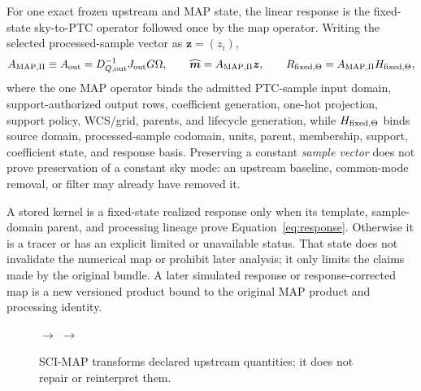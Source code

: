 \documentclass[10pt]{article}
\begin{document}
For one exact frozen upstream and MAP state, the linear response is the
fixed-state sky-to-PTC operator followed once by the map operator. Writing the
selected processed-sample vector as \(\boldsymbol z=(z_i)\),
\begin{equation}
 A_{{\rm MAP},\Pi}\equiv A_{\rm out}
 =D_{Q,{\rm out}}^{-1}J_{\rm out}G\Omega,\qquad
 \widehat{\boldsymbol m}=A_{{\rm MAP},\Pi}\boldsymbol z,\qquad
 R_{{\rm fixed},\Theta}=A_{{\rm MAP},\Pi}H_{{\rm fixed},\Theta},
 \label{eq:response}
\end{equation}
where the one MAP operator binds the admitted PTC-sample input domain,
support-authorized output rows, coefficient generation, one-hot projection,
support policy, WCS/grid, parents, and lifecycle generation, while
\(H_{{\rm fixed},\Theta}\) binds source domain, processed-sample
codomain, units, parent, membership, support, coefficient state, and response
basis. Preserving a constant \emph{sample vector}
does not prove preservation of a constant sky mode: an upstream baseline,
common-mode removal, or filter may already have removed it.

A stored kernel is a fixed-state realized response only when its template,
sample-domain parent, and processing lineage prove Equation~\eqref{eq:response}.
Otherwise it is a tracer or has an explicit limited or unavailable status.
That state does not invalidate the numerical map or prohibit later analysis;
it only limits the claims made by the original bundle. A later simulated
response or response-corrected map is a new versioned product bound to the
original MAP product and processing identity.

\begin{figure}[h]
\centering
{}
\hfill\(\longrightarrow\)\hfill
{}
\hfill\(\longrightarrow\)\hfill
{}
\caption{SCI-MAP transforms declared upstream quantities; it does not repair or reinterpret them.}
\label{fig:flow}
\end{figure}
\end{document}

